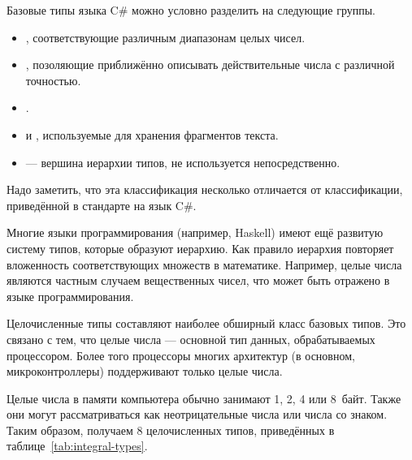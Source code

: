 
Базовые типы языка C\# можно условно разделить на следующие группы.

\begin{itemize}
\item {},
  соответствующие различным диапазонам целых чисел.
\item {}, позоляющие
  приближённо описывать действительные числа с различной точностью.
\item {}.
\item {} и , используемые для хранения
  фрагментов текста.
\item {} — вершина иерархии
  типов, не используется непосредственно.
\end{itemize}

Надо заметить, что эта классификация несколько отличается от
классификации, приведённой в стандарте на язык C\#.

Многие языки программирования (например, Haskell) имеют ещё развитую
систему типов, которые образуют иерархию. Как правило иерархия
повторяет вложенность соответствующих множеств в математике. Например,
целые числа являются частным случаем вещественных чисел, что может
быть отражено в языке программирования.


Целочисленные типы составляют наиболее обширный класс базовых
типов. Это связано с тем, что целые числа — основной тип данных,
обрабатываемых процессором. Более того процессоры многих архитектур (в
основном, микроконтроллеры) поддерживают только целые числа.

Целые числа в памяти компьютера обычно занимают 1, 2, 4 или
8~байт. Также они могут рассматриваться как неотрицательные числа или
числа со знаком. Таким образом, получаем 8 целочисленных типов,
приведённых в таблице~\ref{tab:integral-types}.

